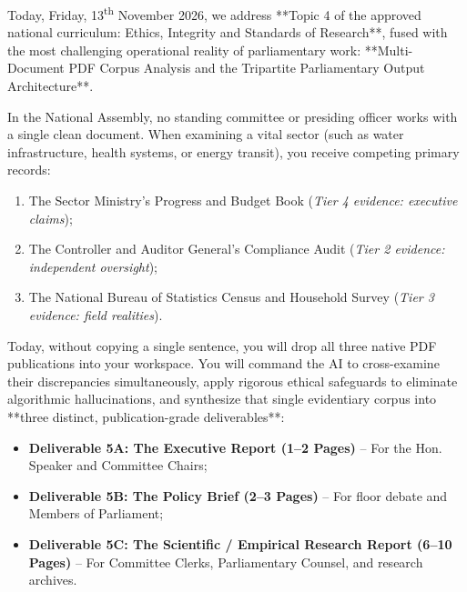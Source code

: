 \documentclass[11pt, a4paper]{report}
\begin{document}
Today, Friday, 13\textsuperscript{th} November 2026, we address **Topic 4 of the approved national curriculum: Ethics, Integrity and Standards of Research**, fused with the most challenging operational reality of parliamentary work: **Multi-Document PDF Corpus Analysis and the Tripartite Parliamentary Output Architecture**.

In the National Assembly, no standing committee or presiding officer works with a single clean document. When examining a vital sector (such as water infrastructure, health systems, or energy transit), you receive competing primary records:
\begin{enumerate}
    \item The Sector Ministry's Progress and Budget Book (\textit{Tier 4 evidence: executive claims});
    \item The Controller and Auditor General's Compliance Audit (\textit{Tier 2 evidence: independent oversight});
    \item The National Bureau of Statistics Census and Household Survey (\textit{Tier 3 evidence: field realities}).
\end{enumerate}

Today, without copying a single sentence, you will drop all three native PDF publications into your workspace. You will command the AI to cross-examine their discrepancies simultaneously, apply rigorous ethical safeguards to eliminate algorithmic hallucinations, and synthesize that single evidentiary corpus into **three distinct, publication-grade deliverables**:
\begin{itemize}[label=-]
    \item \textbf{Deliverable 5A: The Executive Report (1--2 Pages)} -- For the Hon. Speaker and Committee Chairs;
    \item \textbf{Deliverable 5B: The Policy Brief (2--3 Pages)} -- For floor debate and Members of Parliament;
    \item \textbf{Deliverable 5C: The Scientific / Empirical Research Report (6--10 Pages)} -- For Committee Clerks, Parliamentary Counsel, and research archives.
\end{itemize}
\end{document}
